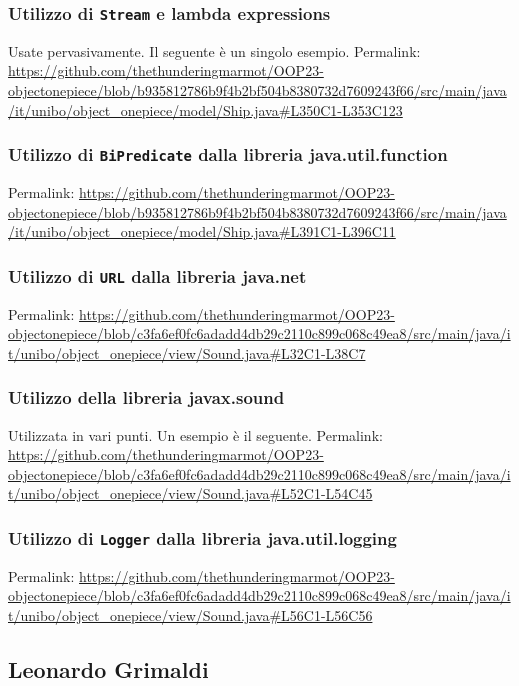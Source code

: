 \documentclass[a4paper,12pt]{report}
\begin{document}
\subsubsection{Utilizzo di \texttt{Stream} e lambda expressions}
Usate pervasivamente. Il seguente è un singolo esempio.
Permalink: \url{https://github.com/thethunderingmarmot/OOP23-objectonepiece/blob/b935812786b9f4b2bf504b8380732d7609243f66/src/main/java/it/unibo/object_onepiece/model/Ship.java#L350C1-L353C123}

\subsubsection{Utilizzo di \texttt{BiPredicate} dalla libreria java.util.function}
Permalink: \url{https://github.com/thethunderingmarmot/OOP23-objectonepiece/blob/b935812786b9f4b2bf504b8380732d7609243f66/src/main/java/it/unibo/object_onepiece/model/Ship.java#L391C1-L396C11}

\subsubsection{Utilizzo di \texttt{URL} dalla libreria java.net}
Permalink: \url{https://github.com/thethunderingmarmot/OOP23-objectonepiece/blob/c3fa6ef0fc6adadd4db29c2110c899c068c49ea8/src/main/java/it/unibo/object_onepiece/view/Sound.java#L32C1-L38C7}

\subsubsection{Utilizzo della libreria javax.sound}
Utilizzata in vari punti. Un esempio è il seguente. 
Permalink: \url{https://github.com/thethunderingmarmot/OOP23-objectonepiece/blob/c3fa6ef0fc6adadd4db29c2110c899c068c49ea8/src/main/java/it/unibo/object_onepiece/view/Sound.java#L52C1-L54C45}

\subsubsection{Utilizzo di \texttt{Logger} dalla libreria java.util.logging}
Permalink: \url{https://github.com/thethunderingmarmot/OOP23-objectonepiece/blob/c3fa6ef0fc6adadd4db29c2110c899c068c49ea8/src/main/java/it/unibo/object_onepiece/view/Sound.java#L56C1-L56C56}

\subsection*{Leonardo Grimaldi}
\end{document}
